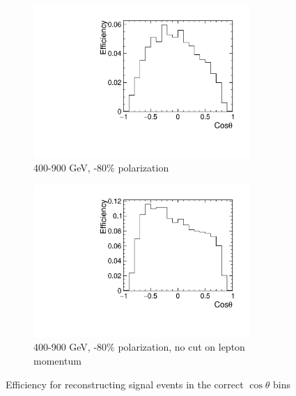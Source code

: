 \begin{figure}
  \centering
  \begin{subfigure}{.5\textwidth}
    \centering
    \includegraphics[width=0.9\textwidth]{TopAnalysis/figures/efficiency_LowE.pdf}
    \caption{400-900 GeV, -80\% polarization}
  \end{subfigure}%
  \begin{subfigure}{.5\textwidth}
    \centering
    \includegraphics[width=0.9\textwidth]{TopAnalysis/figures/efficiency_LowE_NoLepCut.pdf}
    \caption{400-900 GeV, -80\% polarization, no cut on lepton momentum}
  \end{subfigure}
  \caption{Efficiency for reconstructing signal events in the correct $\cos\theta$ bins}
  \label{fig:sigefficienciesb}
\end{figure}

